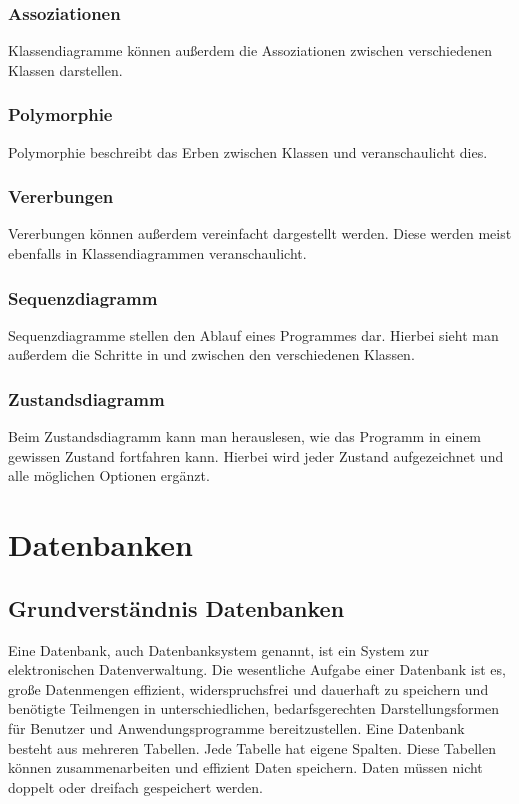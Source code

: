 \documentclass[12pt,a4paper]{article}
\begin{document}
\subsubsection{Assoziationen}
    Klassendiagramme können außerdem die Assoziationen zwischen verschiedenen Klassen darstellen.

\subsubsection{Polymorphie}
    Polymorphie beschreibt das Erben zwischen Klassen und veranschaulicht dies.

\subsubsection{Vererbungen}
    Vererbungen können außerdem vereinfacht dargestellt werden. Diese werden meist ebenfalls in Klassendiagrammen veranschaulicht.

\subsubsection{Sequenzdiagramm}
    Sequenzdiagramme stellen den Ablauf eines Programmes dar. Hierbei sieht man außerdem die Schritte in und zwischen den verschiedenen Klassen.

\subsubsection{Zustandsdiagramm}
    Beim Zustandsdiagramm kann man herauslesen, wie das Programm in einem gewissen Zustand fortfahren kann. Hierbei wird jeder Zustand aufgezeichnet und alle möglichen Optionen ergänzt.

\section{Datenbanken}
\subsection{Grundverständnis Datenbanken}
    Eine Datenbank, auch Datenbanksystem genannt, ist ein System zur elektronischen Datenverwaltung. Die wesentliche Aufgabe einer Datenbank ist es, große Datenmengen effizient, widerspruchsfrei und dauerhaft zu speichern und benötigte Teilmengen in unterschiedlichen, bedarfsgerechten Darstellungsformen für Benutzer und Anwendungsprogramme bereitzustellen.
    Eine Datenbank besteht aus mehreren Tabellen. Jede Tabelle hat eigene Spalten. Diese Tabellen können zusammenarbeiten und effizient Daten speichern. Daten müssen nicht doppelt oder dreifach gespeichert werden.
\end{document}
